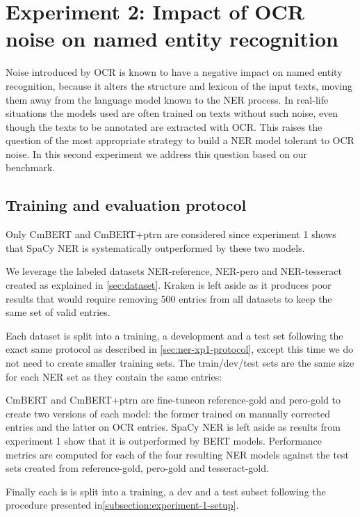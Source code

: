 \section{Experiment 2: Impact of OCR noise on named entity recognition}
\label{sec:ner-xp2}
Noise introduced by OCR is known to have a negative impact on named entity recognition, because it alters the structure and lexicon of the input texts, moving them away from the language model known to the NER process.
In real-life situations the models used are often trained on texts without such noise, even though the texts to be annotated are extracted with OCR.
This raises the question of the most appropriate strategy to build a NER model tolerant to OCR noise.
In this second experiment we address this question based on our benchmark.


\subsection{Training and evaluation protocol}
Only CmBERT and CmBERT+ptrn are considered since experiment 1 shows that SpaCy NER is systematically outperformed by these two models.

We leverage the labeled datasets NER-reference, NER-pero and NER-tesseract created as explained in \cref{sec:dataset}.
Kraken is left aside as it produces poor results that would require removing 500 entries from all datasets to keep the same set of valid entries.

Each dataset is split into a training, a development and a test set following the exact same protocol as described in \cref{sec:ner-xp1-protocol}, except this time we do not need to create smaller training sets.
The train/dev/test sets are the same size for each NER set as they contain the same entries: 

CmBERT and CmBERT+ptrn are fine-tuneon reference-gold and pero-gold to create two versions of each model: the former trained on manually corrected entries and the latter on OCR entries.
SpaCy NER is left aside as results from experiment 1 show that it is outperformed by BERT models.
Performance metrics are computed for each of the four resulting NER models against the test sets created from reference-gold, pero-gold and tesseract-gold.



Finally each is is split into a training, a dev and a test subset following the procedure presented in\cref{subsection:experiment-1-setup}.



